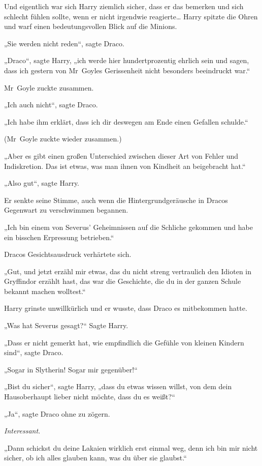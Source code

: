 {Und eigentlich war sich Harry ziemlich sicher, dass er das bemerken und sich schlecht fühlen sollte, wenn er nicht irgendwie reagierte… Harry spitzte die Ohren und warf einen bedeutungsvollen Blick auf die Minions.

„Sie werden nicht reden“, sagte Draco.

„Draco“, sagte Harry, „ich werde hier hundertprozentig ehrlich sein und sagen, dass ich gestern von Mr~Goyles Gerissenheit nicht besonders beeindruckt war.“

Mr~Goyle zuckte zusammen.

„Ich auch nicht“, sagte Draco.

„Ich habe ihm erklärt, dass ich dir deswegen am Ende einen Gefallen schulde.“

(Mr~Goyle zuckte wieder zusammen.)

„Aber es gibt einen großen Unterschied zwischen dieser Art von Fehler und Indiskretion. Das ist etwas, was man ihnen von Kindheit an beigebracht hat.“

„Also gut“, sagte Harry.

Er senkte seine Stimme, auch wenn die Hintergrundgeräusche in Dracos Gegenwart zu verschwimmen begannen.

„Ich bin einem von Severus' Geheimnissen auf die Schliche gekommen und habe ein bisschen Erpressung betrieben.“

Dracos Gesichtsausdruck verhärtete sich.

„Gut, und jetzt erzähl mir etwas, das du nicht streng vertraulich den Idioten in Gryffindor erzählt hast, das war die Geschichte, die du in der ganzen Schule bekannt machen wolltest.“

Harry grinste unwillkürlich und er wusste, dass Draco es mitbekommen hatte.

„Was hat Severus gesagt?“ Sagte Harry.

„Dass er nicht gemerkt hat, wie empfindlich die Gefühle von kleinen Kindern sind“, sagte Draco.

„Sogar in Slytherin! Sogar mir gegenüber!“

„Bist du sicher“, sagte Harry, „dass du etwas wissen willst, von dem dein Hausoberhaupt lieber nicht möchte, dass du es weißt?“

„Ja“, sagte Draco ohne zu zögern.

\emph{Interessant}.

„Dann schickst du deine Lakaien wirklich erst einmal weg, denn ich bin mir nicht sicher, ob ich alles glauben kann, was du über sie glaubst.“

}

